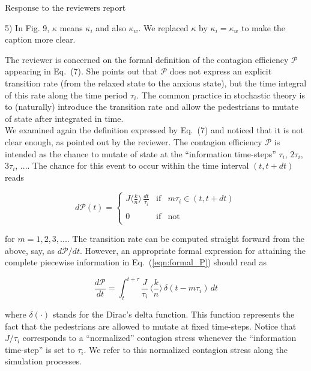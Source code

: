 \documentclass[a4paper,12pt]{letter}
\begin{document}
\begin{letter}{Response to the reviewers report}
{5) In Fig. 9, $\kappa$ means $\kappa_i$ and also $\kappa_w$. We replaced $\kappa$ by $\kappa_i = \kappa_w$ to make the caption more clear.   

\iffalse
The reviewer is concerned on the formal definition of the contagion 
efficiency $\mathcal{P}$ appearing in Eq.~(7). She points out that 
$\mathcal{P}$ does not express an explicit transition rate (from the relaxed 
state to the anxious state), but the time integral of this rate along the time 
period $\tau_i$. The common practice in stochastic theory is to (naturally) 
introduce the transition rate and allow the pedestrians to mutate of state 
after integrated in time. \\

We examined again the definition expressed by Eq.~(7) and noticed that it is 
not clear enough, as pointed out by the reviewer. The contagion efficiency 
$\mathcal{P}$ is intended as the chance to mutate of state at the ``information 
time-steps'' $\tau_i$, $2\tau_i$, $3\tau_i$, ....  The chance for this event to 
occur within the time interval $(t,t+dt)$ reads 


\begin{equation}
 d\mathcal{P}(t)=\left\{\begin{array}{ccl}
                    
J\displaystyle\bigg\langle\frac{k}{n}\bigg\rangle\,
\displaystyle\frac{dt}{\tau_i} &
\mathrm{if} & m\tau_i\in (t,t+dt) \\
                    & & \\
                    0  & \mathrm{if} & \mathrm{not}  \\
                    \end{array}\right.\label{eqn:formal_P}
\end{equation}

for $m=1,2,3,...$. The transition rate can be computed straight forward from 
the above, say, as $d\mathcal{P}/dt$.  However, an appropriate formal 
expression for attaining the complete piecewise information in 
Eq.~(\ref{eqn:formal_P}) should read as

\begin{equation} 
\displaystyle\frac{d\mathcal{P}}{dt}
=\displaystyle\int_t^{t+\tau}
\displaystyle\frac{J}{\tau_i}\,
\displaystyle\bigg\langle\frac{k}{n}\bigg\rangle \,
\delta(t-m\tau_i)\,dt\label{eqn:formal_P_2}
\end{equation}

where $\delta(\cdot)$ stands for the Dirac's delta function. This function 
represents the fact that the pedestrians are allowed to mutate at fixed 
time-steps.  Notice that $J/\tau_i$ corresponds to a ``normalized'' contagion 
stress whenever the ``information time-step'' is set to $\tau_i$. We refer to 
this normalized contagion stress along the simulation processes.  \\

}
\end{letter}
\end{document}
